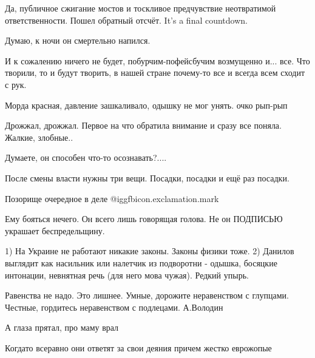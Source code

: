  
 
 
 
 
\zzSecCmt

\begin{itemize} %

Да, публичное сжигание мостов и тоскливое предчувствие неотвратимой
ответственности. Пошел обратный отсчёт.
It's a final countdown.

Думаю, к ночи он смертельно напился.


И к сожалению ничего не будет, побурчим-пофейсбучим возмущенно и... все. Что
творили, то и будут творить, в нашей стране почему-то все и всегда всем сходит
с рук.


Морда красная, давление зашкаливало, одышку не мог унять. очко рып-рып

Дрожжал, дрожжал. Первое на что обратила внимание и сразу все поняла. Жалкие, злобные..

Думаете, он способен что-то осознавать?....

После смены власти нужны три вещи. Посадки, посадки и ещё раз посадки.

Позорище очередное в деле @igg{fbicon.exclamation.mark}

Ему бояться нечего. Он всего лишь говорящая голова. Не он ПОДПИСЬЮ украшает беспредельщину.


1) На Украине не работают никакие законы. Законы физики тоже. 2) Данилов
выглядит как насильник или налетчик из подворотни - одышка, босяцкие интонации,
невнятная речь (для него мова чужая). Редкий упырь.

Равенства не надо. Это лишнее.
Умные, дорожите неравенством
с глупцами.
Честные, гордитесь неравенством
с подлецами. А.Володин

А глаза прятал, про маму врал

Когдато всеравно они ответят за свои деяния причем жестко еврожопые


\end{itemize}
